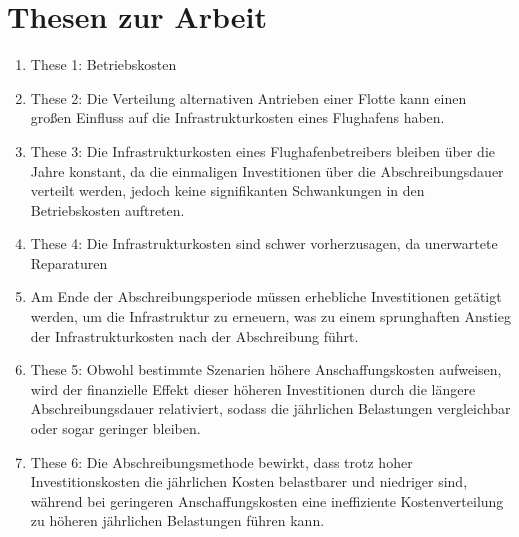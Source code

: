 \chapter*{Thesen zur Arbeit}
\label{ch:Thesen}
\thispagestyle{empty}

\begin{enumerate}
    \item These 1: Betriebskosten
    \item These 2: Die Verteilung alternativen Antrieben einer Flotte kann einen großen Einfluss auf die Infrastrukturkosten eines Flughafens haben.
    \item These 3: Die Infrastrukturkosten eines Flughafenbetreibers bleiben über die Jahre konstant, 
    da die einmaligen Investitionen über die Abschreibungsdauer verteilt werden, jedoch keine signifikanten Schwankungen in 
    den Betriebskosten auftreten.
    
    \item These 4: Die Infrastrukturkosten sind schwer vorherzusagen, da unerwartete Reparaturen 
    \item Am Ende der Abschreibungsperiode müssen erhebliche Investitionen getätigt werden, um die Infrastruktur zu erneuern, 
    was zu einem sprunghaften Anstieg der Infrastrukturkosten nach der Abschreibung führt.
    \item These 5: Obwohl bestimmte Szenarien höhere Anschaffungskosten aufweisen, 
    wird der finanzielle Effekt dieser höheren Investitionen durch die längere Abschreibungsdauer relativiert, 
    sodass die jährlichen Belastungen vergleichbar oder sogar geringer bleiben.
    \item These 6: Die Abschreibungsmethode bewirkt, dass trotz hoher Investitionskosten die jährlichen Kosten belastbarer 
    und niedriger sind, während bei geringeren Anschaffungskosten eine ineffiziente Kostenverteilung zu 
    höheren jährlichen Belastungen führen kann.
\end{enumerate}